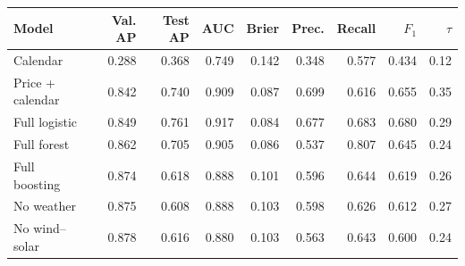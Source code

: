 \begin{tabular}{lrrrrrrrr}
\toprule
Model & Val. AP & Test AP & AUC & Brier & Prec. & Recall & $F_1$ & $\tau$ \\
\midrule
Calendar & 0.288 & 0.368 & 0.749 & 0.142 & 0.348 & 0.577 & 0.434 & 0.12 \\
Price + calendar & 0.842 & 0.740 & 0.909 & 0.087 & 0.699 & 0.616 & 0.655 & 0.35 \\
Full logistic & 0.849 & 0.761 & 0.917 & 0.084 & 0.677 & 0.683 & 0.680 & 0.29 \\
Full forest & 0.862 & 0.705 & 0.905 & 0.086 & 0.537 & 0.807 & 0.645 & 0.24 \\
Full boosting & 0.874 & 0.618 & 0.888 & 0.101 & 0.596 & 0.644 & 0.619 & 0.26 \\
No weather & 0.875 & 0.608 & 0.888 & 0.103 & 0.598 & 0.626 & 0.612 & 0.27 \\
No wind--solar & 0.878 & 0.616 & 0.880 & 0.103 & 0.563 & 0.643 & 0.600 & 0.24 \\
\bottomrule
\end{tabular}
